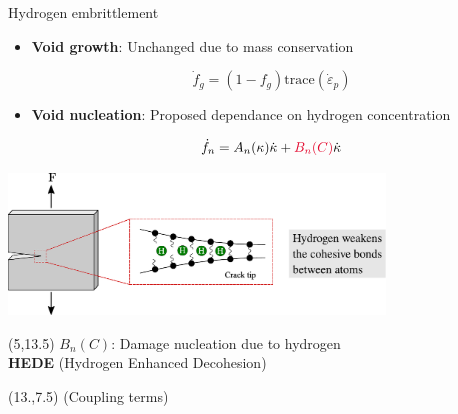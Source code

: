 \documentclass[9pt]{beamer}
\begin{document}
\begin{frame}{Hydrogen embrittlement}

    \begin{itemize}

        \item \textbf{Void growth}: Unchanged due to mass conservation
        
        \begin{equation*}
            \dot{f}_g = (1-f_g) \textrm{trace}(\dot{\varepsilon}_p)
        \end{equation*}  

        \vspace{0.2cm} 
        
        \item\textbf{Void nucleation}: Proposed dependance on hydrogen concentration
        
        \begin{equation*}
            \dot{f}_n = A_n (\kappa) \dot{\kappa} + \textcolor{NewRed}{B_n (C)} \dot{\kappa}
        \end{equation*}

    \end{itemize}
    
    \hspace{1.5cm} \includegraphics[width=0.75\textwidth]{Images/HEDE3.pdf}

    \begin{textblock}{10}(5,13.5)
        \textcolor{NewRed}{$B_n (C)$}: Damage nucleation due to hydrogen \\ \textbf{HEDE} (Hydrogen Enhanced Decohesion)
    \end{textblock}
    
    \begin{textblock}{5}(13.,7.5)
        \textcolor{NewRed}{\footnotesize (Coupling terms)}
    \end{textblock}

\end{frame}

\end{document}
